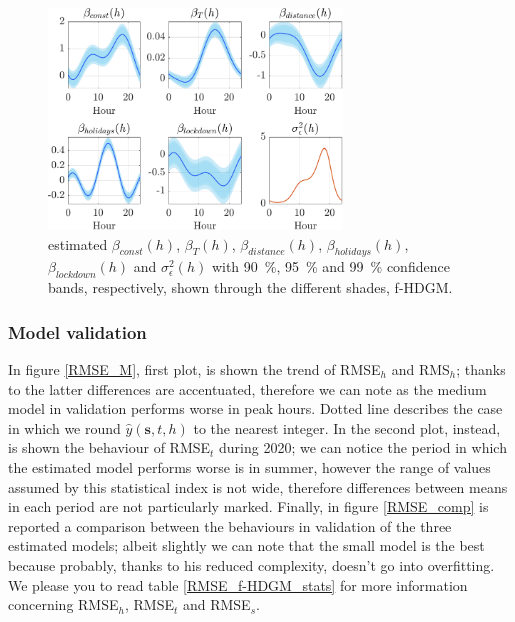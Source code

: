 \begin{figure}
	\centering
	\includegraphics[height=222px]{Images/Data analysis/f-HDGM/Chosen/Trend_beta_M.pdf}
	\caption[Estimated $\beta_{const}(h)$, $\beta_T(h)$, $\beta_{distance}(h)$, $\beta_{holidays}(h)$ and $\beta_{lockdown}(h)$ (f-HDGM)]{estimated $\beta_{const}(h)$, $\beta_T(h)$, $\beta_{distance}(h)$, $\beta_{holidays}(h)$, $\beta_{lockdown}(h)$ and $\sigma_{\epsilon}^2(h)$ with \SI{90}{\percent}, \SI{95}{\percent} and \SI{99}{\percent} confidence bands, respectively, shown through the different shades, f-HDGM.}
	\label{Trend_beta_M}
\end{figure}

\subsubsection{Model validation}
In figure \ref{RMSE_M}, first plot, is shown the trend of RMSE$_h$ and RMS$_h$; thanks to the latter differences are accentuated, therefore we can note as the medium model in validation performs worse in peak hours. Dotted line describes the case in which we round $\hat{y}(\boldsymbol{s}, t, h)$ to the nearest integer. In the second plot, instead, is shown the behaviour of RMSE$_t$ during \num{2020}; we can notice the period in which the estimated model performs worse is in summer, however the range of values assumed by this statistical index is not wide, therefore differences between means in each period are not particularly marked. Finally, in figure \ref{RMSE_comp} is reported a comparison between the behaviours in validation of the three estimated models; albeit slightly we can note that the small model is the best because probably, thanks to his reduced complexity, doesn't go into overfitting. We please you to read table \ref{RMSE_f-HDGM_stats} for more information concerning RMSE$_h$, RMSE$_t$ and RMSE$_s$.


